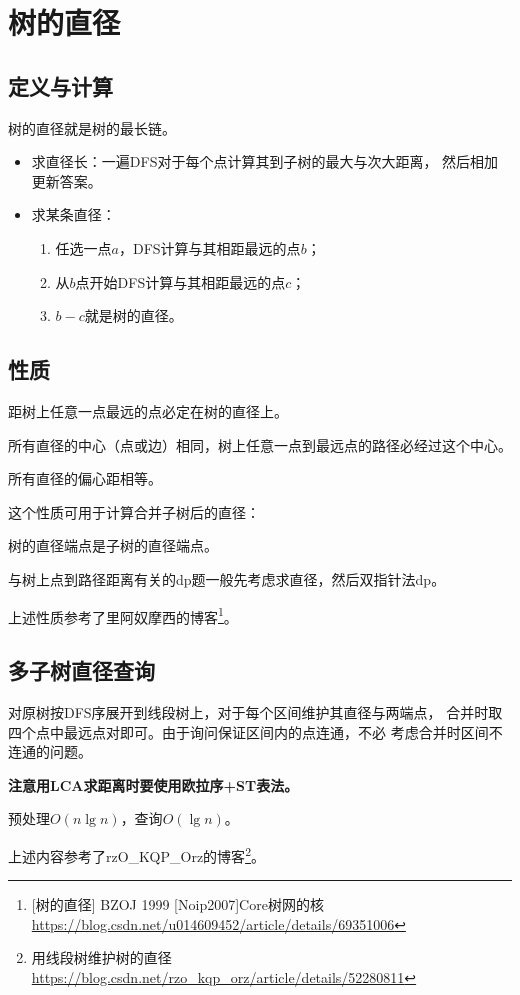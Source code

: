 \section{树的直径}
\subsection{定义与计算}
树的直径就是树的最长链。

\begin{itemize}
    \item 求直径长：一遍DFS对于每个点计算其到子树的最大与次大距离，
    然后相加更新答案。
    \item
    求某条直径：
    \begin{enumerate}
        \item 任选一点$a$，DFS计算与其相距最远的点$b$；
        \item 从$b$点开始DFS计算与其相距最远的点$c$；
        \item $b-c$就是树的直径。
    \end{enumerate}
\end{itemize}

\subsection{性质}

\begin{property}
    距树上任意一点最远的点必定在树的直径上。
\end{property}

\begin{property}
    所有直径的中心（点或边）相同，树上任意一点到最远点的路径必经过这个中心。
\end{property}

\begin{property}
    所有直径的偏心距相等。
\end{property}

这个性质可用于计算合并子树后的直径：
\begin{property}
    树的直径端点是子树的直径端点。
\end{property}

与树上点到路径距离有关的dp题一般先考虑求直径，然后双指针法dp。

上述性质参考了里阿奴摩西的博客\footnote{[树的直径] BZOJ 1999 [Noip2007]Core树网的核
\url{https://blog.csdn.net/u014609452/article/details/69351006}}。

\subsection{多子树直径查询}
对原树按DFS序展开到线段树上，对于每个区间维护其直径与两端点，
合并时取四个点中最远点对即可。由于询问保证区间内的点连通，不必
考虑合并时区间不连通的问题。

{\bfseries 注意用LCA求距离时要使用欧拉序+ST表法。}

预处理$O(n\lg n)$，查询$O(\lg n)$。

上述内容参考了rzO\_KQP\_Orz的博客\footnote{用线段树维护树的直径
\url{https://blog.csdn.net/rzo\_kqp\_orz/article/details/52280811}
}。
